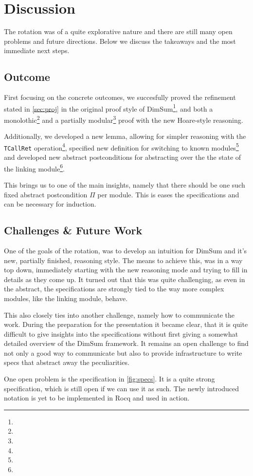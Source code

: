 \documentclass[runningheads, orivec]{llncs}
\begin{document}
\section{Discussion}

The rotation was of a quite explorative nature and there are still many open problems and future directions. Below we discuss the takeaways and the most immediate next steps.

\subsection{Outcome}

First focusing on the concrete outcomes, we succesfully proved the refinement stated in \cref{sec:proj} in the original proof style of DimSum\footnote{}, and both a monolothic\footnote{} and a partially modular\footnote{} proof with the new Hoare-style reasoning.

Additionally, we developed a new lemma, allowing for simpler reasoning with the \texttt{TCallRet} operation\footnote{}, specified new definition for switching to known modules\footnote{} and developed new abstract postconditions for abstracting over the the state of the linking module\footnote{}.

This brings us to one of the main insights, namely that there should be one such fixed abstract postcondition $\Pi$ per module. This is eases the specifications and can be necessary for induction.

\subsection{Challenges \& Future Work}

One of the goals of the rotation, was to develop an intuition for DimSum and it's new, partially finished, reasoning style. The means to achieve this, was in a way top down, immediately starting with the new reasoning mode and trying to fill in details as they come up. It turned out that this was quite challenging, as even in the abstract, the specifications are strongly tied to the way more complex modules, like the linking module, behave.

This also closely ties into another challenge, namely how to communicate the work. During the preparation for the presentation it became clear, that it is quite difficult to give insights into the specifications without first giving a somewhat detailed overview of the DimSum framework. It remains an open challenge to find not only a good way to communicate but also to provide infrastructure to write specs that abstract away the peculiarities.

One open problem is the specification in \cref{fig:specs}. It is a quite strong specification, which is still open if we can use it as such.
The newly introduced notation is yet to be implemented in Rocq and used in action.



\end{document}

